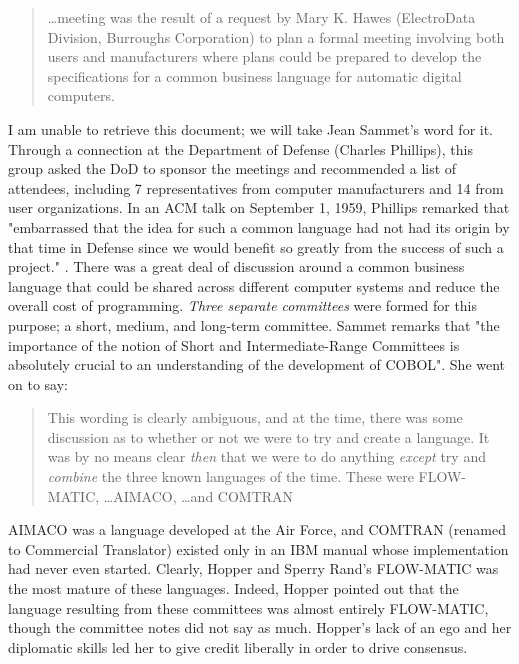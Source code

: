 \begin{quotation}
\dots meeting was the result of a request by
Mary K. Hawes (ElectroData Division, Burroughs Corporation) to plan a formal meeting
involving both users and manufacturers where plans could be prepared to develop the
specifications for a common business language for automatic digital computers.
\end{quotation}

I am unable to retrieve this document; we will take Jean Sammet's word for it.
Through a connection at the Department of Defense (Charles Phillips), this group
asked the DoD to sponsor the meetings and recommended a list of attendees, including
7 representatives from computer manufacturers and 14 from user organizations.
In an ACM talk on September 1, 1959, Phillips remarked that "embarrassed that 
the idea for such a common language had not had its origin by that time in 
Defense since we would benefit so greatly from the success of such a project."
\cite[Phillips, as quoted by Sammet in]{sammet_programming_languages_history_and_fundamentals_1969}.
There was a great deal of discussion around a common business language
that could be shared across different computer systems and reduce the overall cost of programming.
\textit{Three separate committees} were formed for this purpose; a short, medium, and long-term committee.
Sammet remarks that "the importance of the notion of Short and 
Intermediate-Range Committees is absolutely crucial to an understanding of the 
development of COBOL"\cite{sammet_early_history_of_cobol_1978}.
She went on to say:

\begin{quotation}
This wording is clearly ambiguous, and at the time, there was some discussion 
as to whether or not we were to try and create a language. It was by no means 
clear \textit{then} that we were to do anything \textit{except} try and 
\textit{combine} the three known languages of the time.
These were FLOW-MATIC, \dots AIMACO, \dots and COMTRAN
\end{quotation}

AIMACO was a language developed at the Air Force, and COMTRAN (renamed to Commercial Translator)
existed only in an IBM manual whose implementation had never even started.
Clearly, Hopper and Sperry Rand's FLOW-MATIC was the most mature of these languages.
Indeed, Hopper pointed out that the language resulting from these committees
was almost entirely FLOW-MATIC\cite{Hopper_1980_Oral_History}, though the committee notes
did not say as much. Hopper's lack of an ego and her diplomatic skills
led her to give credit liberally in order to drive consensus.

